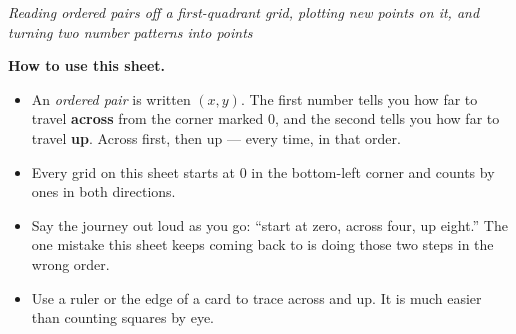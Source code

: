\documentclass[12pt]{article}
\begin{document}

\begin{center}\small\textit{Reading ordered pairs off a first-quadrant grid, plotting new
points on it, and turning two number patterns into points}\end{center}

\noindent\small\textbf{How to use this sheet.}
\begin{itemize}[label={$\bullet$}, leftmargin=1.1cm, itemsep=1pt, topsep=2pt]
  \item An \emph{ordered pair} is written $(x, y)$. The first number tells you how far to
        travel \textbf{across} from the corner marked $0$, and the second tells you how far
        to travel \textbf{up}. Across first, then up --- every time, in that order.
  \item Every grid on this sheet starts at $0$ in the bottom-left corner and counts by ones
        in both directions.
  \item Say the journey out loud as you go: ``start at zero, across four, up eight.'' The
        one mistake this sheet keeps coming back to is doing those two steps in the wrong
        order.
  \item Use a ruler or the edge of a card to trace across and up. It is much easier than
        counting squares by eye.
\end{itemize}
\normalsize

\bigskip
\end{document}
